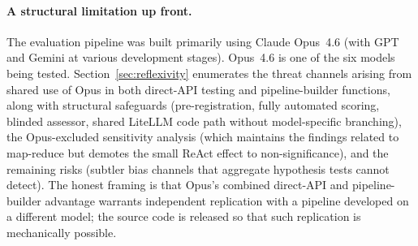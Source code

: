 \paragraph{A structural limitation up front.}
The evaluation pipeline was built primarily using Claude Opus~4.6 (with GPT and Gemini at various development stages).  Opus~4.6 is one of the six models being tested.  Section~\ref{sec:reflexivity} enumerates the threat channels arising from shared use of Opus in both direct-API testing and pipeline-builder functions, along with structural safeguards (pre-registration, fully automated scoring, blinded assessor, shared LiteLLM code path without model-specific branching), the Opus-excluded sensitivity analysis (which maintains the findings related to map-reduce but demotes the small ReAct effect to non-significance), and the remaining risks (subtler bias channels that aggregate hypothesis tests cannot detect).  The honest framing is that Opus's combined direct-API and pipeline-builder advantage warrants independent replication with a pipeline developed on a different model; the source code is released so that such replication is mechanically possible.
